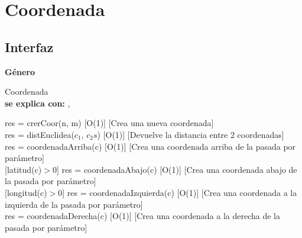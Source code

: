 \section{Coordenada}


\subsection{Interfaz}

\parbox {1,7cm}{{\bf Género}} Coordenada \\
{\bf se explica con:}  , \\
\medskip

{res = crerCoor(n, m)}
[O(1)]
[Crea una nueva coordenada]
\\

{res = distEuclidea($c_1$, $c_2s$)}
[O(1)]
[Devuelve la distancia entre 2 coordenadas]
\\

{res = coordenadaArriba(c)}
[O(1)]
[Crea una coordenada arriba de la pasada por parámetro]
\\

[latitud(c)$>$0]
{res = coordenadaAbajo(c)}
[O(1)]
[Crea una coordenada abajo de la pasada por parámetro]
\\

[longitud(c)$>$0]
{res = coordenadaIzquierda(c)}
[O(1)]
[Crea una coordenada a la izquierda de la pasada por parámetro]
\\

{res = coordenadaDerecha(c)}
[O(1)]
[Crea una coordenada a la derecha de la pasada por parámetro]
\\


